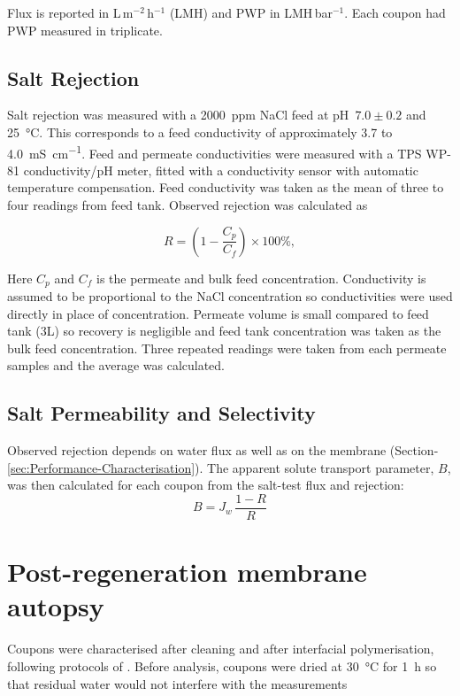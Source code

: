 Flux is reported in L\,m$^{-2}$\,h$^{-1}$ (LMH) and PWP in LMH\,bar$^{-1}$. Each coupon had PWP measured in triplicate.


\subsection{Salt Rejection}
Salt rejection was measured with a \qty{2000}{ppm} NaCl feed at pH~$7.0 \pm 0.2$ and \qty{25}{\degreeCelsius}. This corresponds to a feed conductivity of approximately \qty{3.7}{} to \qty{4.0}{\milli\siemens\per\centi\metre}. Feed and permeate conductivities were measured with a TPS WP-81 conductivity/pH meter, fitted with a conductivity sensor with automatic temperature compensation. Feed conductivity was taken as the mean of three to four readings from feed tank. Observed rejection was calculated as

\begin{equation}
  R = \left(1 - \frac{C_p}{C_f}\right) \times 100\%,
  \label{eq:rejection-methods}
\end{equation}

Here $C_p$ and $C_f$ is the permeate and bulk feed concentration. Conductivity is assumed to be proportional to the NaCl concentration so conductivities were used directly in place of concentration. Permeate volume is small compared to feed tank (3L) so recovery is negligible and feed tank concentration was taken as the bulk feed concentration. Three repeated readings were taken from each permeate samples and the average was calculated. 

\subsection{Salt Permeability and Selectivity}
Observed rejection depends on water flux as well as on the membrane (Section-\ref{sec:Performance-Characterisation}). The apparent solute transport parameter, $B$, was then calculated for each coupon from the salt-test flux and rejection:
\begin{equation}
  B = J_w\,\frac{1 - R}{R}
  \label{eq:b-methods}
\end{equation}



\section{Post-regeneration membrane autopsy}
\label{sec:autopsy}
Coupons were characterised after cleaning and after interfacial polymerisation, following protocols of \cite{Ogbe2025}. Before analysis, coupons were dried at \qty{30}{\celsius} for \qty{1}{h} so that residual water would not interfere with the measurements

